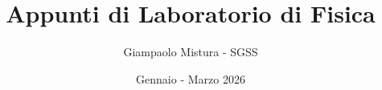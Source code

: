 \documentclass[11pt]{scrartcl}
\begin{document}
	\title{Appunti di Laboratorio di Fisica}
	\subtitle{Giampaolo Mistura - SGSS}
	\date{Gennaio - Marzo 2026}
	
	
	\maketitle
	
	\tableofcontents
	
	\newpage
	
\end{document}
